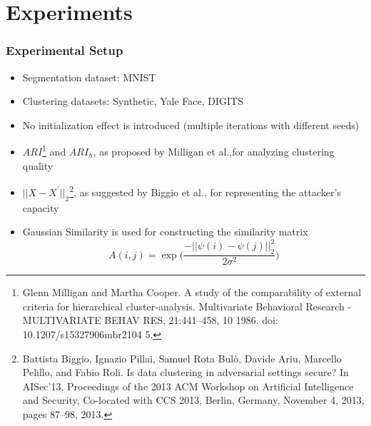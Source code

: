 \documentclass{beamer}
\begin{document}
\section{Experiments}

\begin{frame}
  \frametitle{Experimental Setup}
  \begin{itemize}
  	\item Segmentation dataset: MNIST 
  	\item Clustering datasets: Synthetic, Yale Face, DIGITS
  	\item No initialization effect is introduced (multiple iterations with different seeds)
  	
  	\item $ARI$\footnote{\tiny Glenn Milligan and Martha Cooper. A study of the comparability of external criteria for
  		hierarchical cluster-analysis. Multivariate Behavioral Research - MULTIVARIATE BEHAV
  		RES, 21:441–458, 10 1986. doi: 10.1207/s15327906mbr2104 5.}
  	 and $ARI_h$, as proposed by Milligan et al.,for analyzing clustering quality
  	
  	\item $\vert \vert X - X^\prime\vert \vert_2$\footnote{\tiny{Battista Biggio, Ignazio Pillai, Samuel Rota Bulò, Davide Ariu, Marcello Pelillo, and Fabio
  			Roli. Is data clustering in adversarial settings secure? In AISec’13, Proceedings of the 2013
  			ACM Workshop on Artificial Intelligence and Security, Co-located with CCS 2013, Berlin,
  			Germany, November 4, 2013, pages 87–98, 2013.}}, as suggested by Biggio et al., for representing the attacker's capacity
  	\item Gaussian Similarity is used for constructing the similarity matrix
  	$$A(i,j) = \exp\Big(\frac{-\vert\vert\psi(i)- \psi(j)\vert\vert_2^2}{2\sigma^2}\Big)$$
  \end{itemize}

\end{frame}
\end{document}
